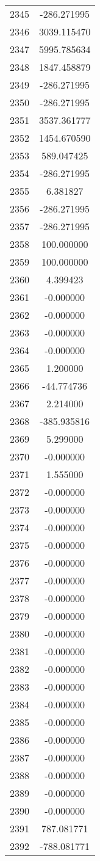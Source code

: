 \documentclass[12pt]{article}
\begin{document}
\begin{longtable}{@{}cc@{}}
2345 & -286.271995 \\
2346 & 3039.115470 \\
2347 & 5995.785634 \\
2348 & 1847.458879 \\
2349 & -286.271995 \\
2350 & -286.271995 \\
2351 & 3537.361777 \\
2352 & 1454.670590 \\
2353 & 589.047425 \\
2354 & -286.271995 \\
2355 & 6.381827 \\
2356 & -286.271995 \\
2357 & -286.271995 \\
2358 & 100.000000 \\
2359 & 100.000000 \\
2360 & 4.399423 \\
2361 & -0.000000 \\
2362 & -0.000000 \\
2363 & -0.000000 \\
2364 & -0.000000 \\
2365 & 1.200000 \\
2366 & -44.774736 \\
2367 & 2.214000 \\
2368 & -385.935816 \\
2369 & 5.299000 \\
2370 & -0.000000 \\
2371 & 1.555000 \\
2372 & -0.000000 \\
2373 & -0.000000 \\
2374 & -0.000000 \\
2375 & -0.000000 \\
2376 & -0.000000 \\
2377 & -0.000000 \\
2378 & -0.000000 \\
2379 & -0.000000 \\
2380 & -0.000000 \\
2381 & -0.000000 \\
2382 & -0.000000 \\
2383 & -0.000000 \\
2384 & -0.000000 \\
2385 & -0.000000 \\
2386 & -0.000000 \\
2387 & -0.000000 \\
2388 & -0.000000 \\
2389 & -0.000000 \\
2390 & -0.000000 \\
2391 & 787.081771 \\
2392 & -788.081771 \\

\end{longtable}
\end{document}
